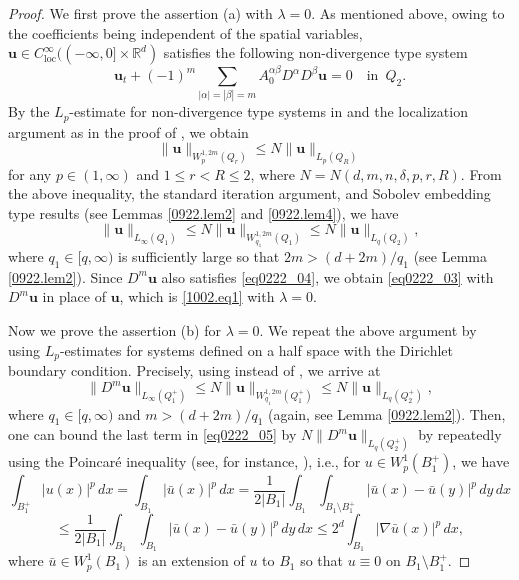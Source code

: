 \documentclass[reqno]{amsart}
\numberwithin{equation}{section}
\theoremstyle{plain}
\theoremstyle{definition}
\theoremstyle{remark}
\begin{document}
\begin{proof}
We first prove the assertion (a) with $\lambda=0$.
As mentioned above, owing to the coefficients being independent of the spatial variables, ${\boldsymbol{u}} \in C_{\operatorname{loc}}^\infty((-\infty,0] \times {\mathbb{R}}^d)$ satisfies the following non-divergence type system
\begin{equation}
							\label{eq0222_04}
{\boldsymbol{u}}_t+(-1)^m \sum_{|\alpha|=|\beta|=m} A_0^{\alpha\beta} D^\alpha D^\beta {\boldsymbol{u}} = 0 \quad \text{in }\, Q_2.
\end{equation}
By the $L_p$-estimate for non-divergence type systems in \cite[Theorem 2]{MR2771670} and the localization argument as in the proof of \cite[Lemma 1]{MR2771670}, we obtain
$$
\|{\boldsymbol{u}}\|_{W_p^{1,2m}(Q_r)}\le N\|{\boldsymbol{u}}\|_{L_p(Q_R)}
$$
for any $p \in (1,\infty)$ and $1 \le r < R \le 2$, where $N=N(d,m,n,\delta,p,r,R)$.
From the above inequality, the standard iteration argument, and Sobolev embedding type results (see Lemmas \ref{0922.lem2} and \ref{0922.lem4}), we have 
\begin{equation}				\label{eq0222_03}
\|{\boldsymbol{u}}\|_{L_\infty(Q_1)} \le N\|{\boldsymbol{u}}\|_{W^{1,2m}_{q_1}(Q_1)}\le N\|{\boldsymbol{u}}\|_{L_q(Q_2)},
\end{equation} 
where $q_1 \in [q,\infty)$ is sufficiently large so that $2m > (d+2m)/q_1$ (see Lemma \ref{0922.lem2}). 
Since $D^m {\boldsymbol{u}}$ also satisfies \eqref{eq0222_04}, we obtain \eqref{eq0222_03} with $D^m {\boldsymbol{u}}$ in place of ${\boldsymbol{u}}$, which is  \eqref{1002.eq1} with $\lambda = 0$.

Now we prove the assertion (b) for $\lambda = 0$. We repeat the above argument by using $L_p$-estimates for systems defined on a half space with the Dirichlet boundary condition. 
Precisely, using \cite[Theorem 4]{MR2771670} instead of \cite[Theorem 2]{MR2771670}, we arrive at
\begin{equation}				\label{eq0222_05}
\|D^m {\boldsymbol{u}}\|_{L_\infty(Q_1^+)} \le N\|{\boldsymbol{u}}\|_{W^{1,2m}_{q_1}(Q_1^+)}\le N\|{\boldsymbol{u}}\|_{L_q(Q_2^+)},
\end{equation}
where $q_1 \in [q,\infty)$ and $m > (d+2m)/q_1$ (again, see Lemma \ref{0922.lem2}). 
Then, one can bound the last term in \eqref{eq0222_05} by $N \|D^m{\boldsymbol{u}}\|_{L_q(Q_2^+)}$ by repeatedly using the Poincar\'e inequality (see, for instance, \cite[Theorem 10.2.5]{MR2435520}), i.e.,
for $u \in W_p^1(B_1^+)$, we have
$$
\int_{B_1^+}|u(x)|^p \, dx=\int_{B_1}|\bar{u}(x)|^p \, dx
=\frac{1}{2|B_1|}\int_{B_1}\int_{B_1 \setminus B_1^+}|\bar{u}(x)-\bar{u}(y)|^p \, dy \, dx
$$
$$
\le \frac{1}{2|B_1|}\int_{B_1}\int_{B_1}|\bar{u}(x)-\bar{u}(y)|^p \, dy \, dx
\le 2^d \int_{B_1}|\nabla \bar{u}(x)|^p \, dx,
$$
where $\bar{u} \in W_p^1(B_1)$ is an extension of $u$ to $B_1$ so that $u \equiv 0$ on $B_1 \setminus B_1^+$.


\end{proof}
\end{document}

